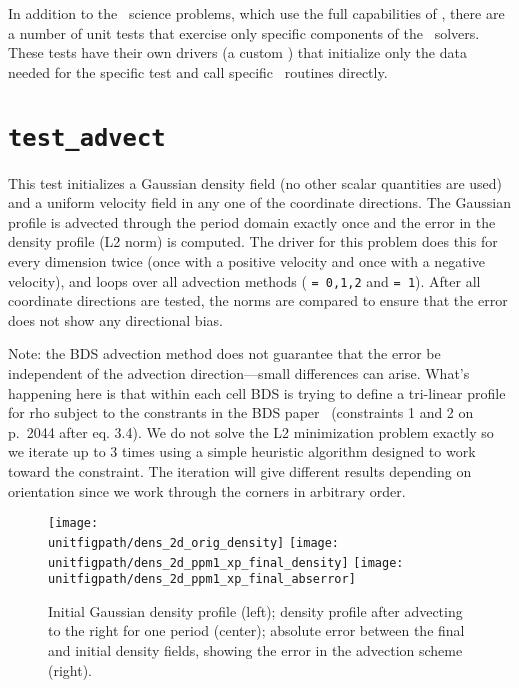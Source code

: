 
\label{chapter:unit_tests}

In addition to the \maestro\ science problems, which use the full
capabilities of \maestro, there are a number of unit tests that
exercise only specific components of the \maestro\ solvers.  These
tests have their own drivers (a custom ) that
initialize only the data needed for the specific test and call
specific \maestro\ routines directly.


\section {\tt test\_advect}

  This test initializes a Gaussian density field (no other scalar
  quantities are used) and a uniform velocity field in any one of the
  coordinate directions.  The Gaussian profile is advected through the
  period domain exactly once and the error in the density profile (L2
  norm) is computed.  The driver for this problem does this for every
  dimension twice (once with a positive velocity and once with a
  negative velocity), and loops over all advection methods
  ( {\tt = 0,1,2} and  {\tt = 1}).  After
  all coordinate directions are tested, the norms are compared to
  ensure that the error does not show any directional bias.

  Note: the BDS advection method does not guarantee that the error be
  independent of the advection direction---small differences can
  arise.  What's happening here is that within each cell BDS is trying
  to define a tri-linear profile for rho subject to the constrants in
  the BDS paper~\cite{bds3d} (constraints 1 and 2 on p.\ 2044 after eq. 3.4).  We
  do not solve the L2 minimization problem exactly so we iterate up to
  3 times using a simple heuristic algorithm designed to work toward
  the constraint.  The iteration will give different results depending
  on orientation since we work through the corners in arbitrary order.

\begin{figure}[t] 
\centering
\texttt{[image: \\unitfigpath/dens\_2d\_orig\_density]}
\texttt{[image: \\unitfigpath/dens\_2d\_ppm1\_xp\_final\_density]}
\texttt{[image: \\unitfigpath/dens\_2d\_ppm1\_xp\_final\_abserror]} 
%
\caption[Results of the {\tt test\_advect} unit test]{\label{fig:unit:advtest}
  Initial Gaussian density profile (left); density profile after
  advecting to the right for one period (center); absolute error
  between the final and initial density fields, showing the error in
  the advection scheme (right).}
\end{figure}



